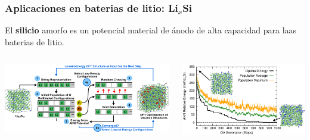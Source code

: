 \documentclass[aspectratio=169]{beamer}
\let\oldtextbf\textbf
\renewcommand{\textbf}[1]{\textcolor{nordblue}{\oldtextbf{#1}}}
\begin{document}
    \begin{frame}
        \frametitle{Aplicaciones en baterias de litio: Li$_x$Si}
        
        El \textbf{silicio} amorfo es un potencial material de ánodo de alta
        capacidad para laas baterias de litio.
        
        \begin{columns}
            \begin{center}
                \includegraphics[width=\columnwidth]{LiSi-metodo.png}
            \end{center}

            \begin{center}
                \includegraphics[width=\columnwidth]{LiSi-optimizacion_de_la_energia.png}
            \end{center}
        \end{columns}
            
    \end{frame}
    
\end{document}
